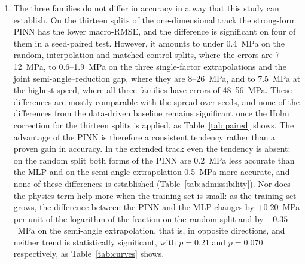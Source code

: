 \documentclass[subscriptcorrection,upint,varvw,barcolor=Goldenrod3,mathalfa=cal=euler,balance,hyphenate,french,pdf-a]{asmejour} %
\begin{document}
\begin{enumerate}
\item The three families do not differ in accuracy in a way that this study can establish. On the thirteen splits of the one-dimensional track the strong-form PINN has the lower macro-RMSE, and the difference is significant on four of them in a seed-paired test. However, it amounts to under 0.4~MPa on the random, interpolation and matched-control splits, where the errors are 7--12~MPa, to 0.6--1.9~MPa on the three single-factor extrapolations and the joint semi-angle--reduction gap, where they are 8--26~MPa, and to 7.5~MPa at the highest speed, where all three families have errors of 48--56~MPa. These differences are mostly comparable with the spread over seeds, and none of the differences from the data-driven baseline remains significant once the Holm correction for the thirteen splits is applied, as Table~\ref{tab:paired} shows. The advantage of the PINN is therefore a consistent tendency rather than a proven gain in accuracy. In the extended track even the tendency is absent: on the random split both forms of the PINN are 0.2~MPa less accurate than the MLP and on the semi-angle extrapolation 0.5~MPa more accurate, and none of these differences is established (Table~\ref{tab:admissibility}). Nor does the physics term help more when the training set is small: as the training set grows, the difference between the PINN and the MLP changes by $+0.20$~MPa per unit of the logarithm of the fraction on the random split and by $-0.35$~MPa on the semi-angle extrapolation, that is, in opposite directions, and neither trend is statistically significant, with $p=0.21$ and $p=0.070$ respectively, as Table~\ref{tab:curves} shows. %


\end{enumerate}
\end{document}
